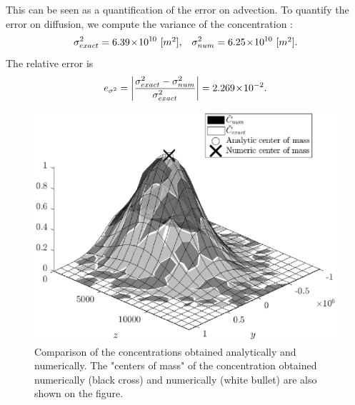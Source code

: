 This can be seen as a quantification of the error on advection. To quantify the error on diffusion, we compute the variance of the concentration :
\begin{equation}
	\sigma^2_{exact} = 6.39\!\times\!10^{10} \mbox{ [$m^2$],}\quad \sigma^2_{num} = 6.25\!\times\!10^{10} \mbox{ [$m^2$].}
\end{equation}
The relative error is
\begin{equation}
	e_{\sigma^2} = \left \lvert \frac{\sigma^2_{exact}-\sigma^2_{num}}{\sigma^2_{exact}}\right \rvert = 2.269\!\times\!10^{-2}.
\end{equation}
\begin{figure}[H]
	\centering
	\includegraphics[width = \textwidth]{fig/testcase/testcaseSI_surf.eps}
	\caption{Comparison of the concentrations obtained analytically and numerically. The "centers of mass" of the concentration obtained numerically (black cross) and numerically (white bullet) are also shown on the figure.}
	\label{fig:testcaseSI_surf}
\end{figure}
